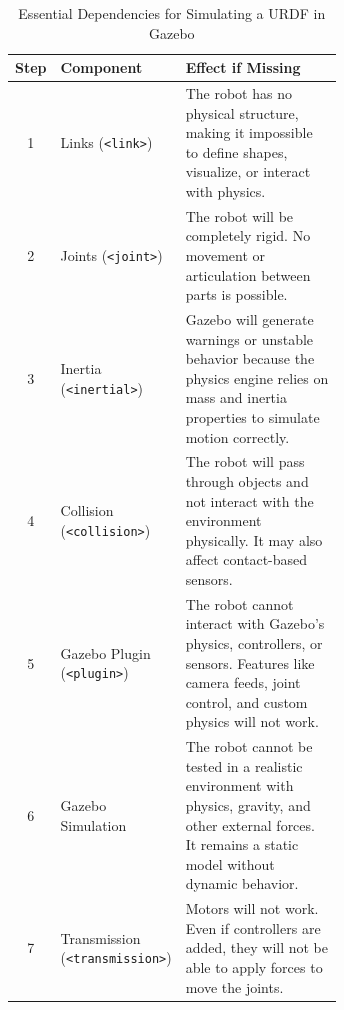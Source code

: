 \documentclass[../../main]{subfiles}
\begin{document}
\renewcommand{\arraystretch}{1.4} %
\begin{table}[ht]
    \centering
\begin{tcolorbox}[
    colback=red!5!white,colframe=red!75!black,
    title={\textbf{Dependencies for URDF Simulation in Gazebo}},
    fonttitle=\bfseries, coltitle=white, width=\linewidth
]

\centering
\begin{adjustbox}{max width=\linewidth} %
\begin{tabular}{c|l|p{0.65\linewidth}} %
    
    \rowcolor{red!20} 
    \textbf{Step} & \textbf{Component} & \textbf{Effect if Missing} \\
    \midrule
    1 & Links (\texttt{<link>}) & The robot has no physical structure, making it impossible to define shapes, visualize, or interact with physics. \\
    2 & Joints (\texttt{<joint>}) & The robot will be completely rigid. No movement or articulation between parts is possible. \\
    3 & Inertia (\texttt{<inertial>}) & Gazebo will generate warnings or unstable behavior because the physics engine relies on mass and inertia properties to simulate motion correctly. \\
    4 & Collision (\texttt{<collision>}) & The robot will pass through objects and not interact with the environment physically. It may also affect contact-based sensors. \\
    5 & Gazebo Plugin (\texttt{<plugin>}) & The robot cannot interact with Gazebo’s physics, controllers, or sensors. Features like camera feeds, joint control, and custom physics will not work. \\
    6 & Gazebo Simulation & The robot cannot be tested in a realistic environment with physics, gravity, and other external forces. It remains a static model without dynamic behavior. \\
    7 & Transmission (\texttt{<transmission>}) & Motors will not work. Even if controllers are added, they will not be able to apply forces to move the joints. \\
\end{tabular}
\end{adjustbox}
\end{tcolorbox}
\caption{Essential Dependencies for Simulating a URDF in Gazebo}  %
\end{table}
\end{document}
